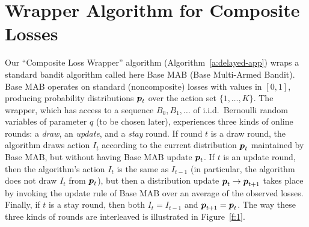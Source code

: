 \newcommand{\blhat}{\widehat{\bloss}}
\newcommand{\bmu}{\boldsymbol{\mu}}
\newcommand{\bq}{\boldsymbol{q}}
\section{Wrapper Algorithm for Composite Losses}
\label{s:wrapper}
%
Our ``Composite Loss Wrapper'' algorithm (Algorithm~\ref{a:delayed-app}) wraps a standard bandit algorithm called here Base MAB (Base Multi-Armed Bandit). Base MAB operates on standard (noncomposite) losses with values in $[0,1]$,
producing probability distributions $\boldsymbol{p}_t$ over the action set $\{1,\ldots,K\}$. The wrapper, which has access to a sequence
$B_0,B_1,\dots$ of i.i.d.\ Bernoulli random variables of parameter $q$ (to be chosen later), experiences three kinds of online rounds: a {\em draw}, an {\em update}, and a {\em stay}
round. If round $t$ is a draw round, the algorithm draws action $I_t$ according to the current distribution $\boldsymbol{p}_t$
maintained by Base MAB, but without having Base MAB update $\boldsymbol{p}_t$. If $t$ is an update round, then the algorithm's
action $I_t$ is the same as $I_{t-1}$ (in particular, the algorithm does not draw $I_t$ from $\boldsymbol{p}_t$), but then a
distribution update $\boldsymbol{p}_t \rightarrow \boldsymbol{p}_{t+1}$ takes place by invoking the update rule of Base MAB over an
average of the observed losses.
Finally, if $t$ is a stay round, then both $I_t = I_{t-1}$ and $\boldsymbol{p}_{t+1} = \boldsymbol{p}_{t}$. The way these three
kinds of rounds are interleaved is illustrated in Figure~\ref{f:1}.
%
